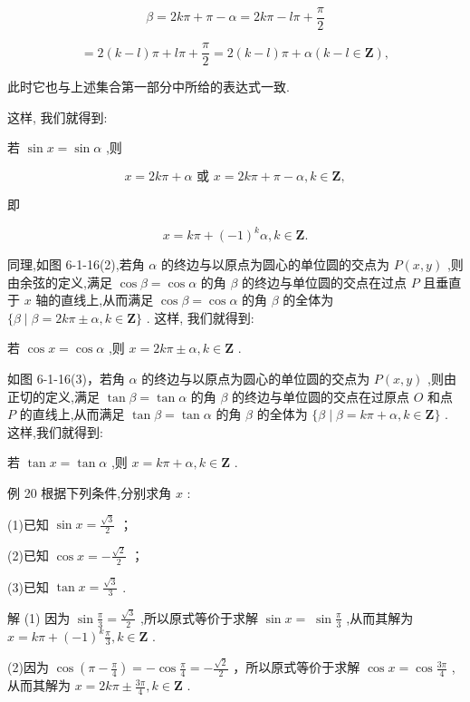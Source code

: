 \documentclass[10pt]{article}
\begin{document}
\[
\beta  = {2k\pi } + \pi  - \alpha  = {2k\pi } - {l\pi } + \frac{\pi }{2}
\]

\[
= 2\left( {k - l}\right) \pi  + {l\pi } + \frac{\pi }{2} = 2\left( {k - l}\right) \pi  + \alpha \left( {k - l \in  \mathbf{Z}}\right) ,
\]

此时它也与上述集合第一部分中所给的表达式一致.

这样, 我们就得到:

若 \(\sin x = \sin \alpha\) ,则

\[
x = {2k\pi } + \alpha \text{ 或 }x = {2k\pi } + \pi  - \alpha ,k \in  \mathbf{Z},
\]

即

\[
x = {k\pi } + {\left( -1\right) }^{k}\alpha ,k \in  \mathbf{Z}.
\]

同理,如图 6-1-16(2),若角 \(\alpha\) 的终边与以原点为圆心的单位圆的交点为 \(P\left( {x,y}\right)\) ,则由余弦的定义,满足 \(\cos \beta  = \cos \alpha\) 的角 \(\beta\) 的终边与单位圆的交点在过点 \(P\) 且垂直于 \(x\) 轴的直线上,从而满足 \(\cos \beta  = \cos \alpha\) 的角 \(\beta\) 的全体为 \(\{ \beta  \mid  \beta  = {2k\pi } \pm  \alpha ,k \in  \mathbf{Z}\}\) . 这样, 我们就得到:

若 \(\cos x = \cos \alpha\) ,则 \(x = {2k\pi } \pm  \alpha ,k \in  \mathbf{Z}\) .

如图 6-1-16(3)，若角 \(\alpha\) 的终边与以原点为圆心的单位圆的交点为 \(P\left( {x,y}\right)\) ,则由正切的定义,满足 \(\tan \beta  = \tan \alpha\) 的角 \(\beta\) 的终边与单位圆的交点在过原点 \(O\) 和点 \(P\) 的直线上,从而满足 \(\tan \beta  = \tan \alpha\) 的角 \(\beta\) 的全体为 \(\{ \beta  \mid  \beta  = {k\pi } + \alpha ,k \in  \mathbf{Z}\}\) . 这样,我们就得到:

若 \(\tan x = \tan \alpha\) ,则 \(x = {k\pi } + \alpha ,k \in  \mathbf{Z}\) .

例 20 根据下列条件,分别求角 \(x\) :

(1)已知 \(\sin x = \frac{\sqrt{3}}{2}\) ；

(2)已知 \(\cos x =  - \frac{\sqrt{2}}{2}\) ；

(3)已知 \(\tan x = \frac{\sqrt{3}}{3}\) .

解 (1) 因为 \(\sin \frac{\pi }{3} = \frac{\sqrt{3}}{2}\) ,所以原式等价于求解 \(\sin x = \; \sin \frac{\pi }{3}\) ,从而其解为 \(x = {k\pi } + {\left( -1\right) }^{k}\frac{\pi }{3},k \in  \mathbf{Z}\) .

(2)因为 \(\cos \left( {\pi  - \frac{\pi }{4}}\right)  =  - \cos \frac{\pi }{4} =  - \frac{\sqrt{2}}{2}\) ，所以原式等价于求解 \(\cos x = \cos \frac{3\pi }{4}\) ,从而其解为 \(x = {2k\pi } \pm  \frac{3\pi }{4},k \in  \mathbf{Z}\) .
\end{document}
